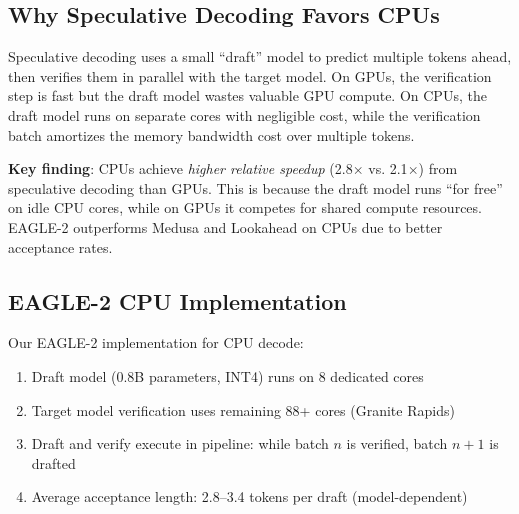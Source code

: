 \documentclass[conference,10pt]{IEEEtran}
\begin{document}
\subsection{Why Speculative Decoding Favors CPUs}

Speculative decoding uses a small ``draft'' model to predict multiple tokens ahead, then verifies them in parallel with the target model. On GPUs, the verification step is fast but the draft model wastes valuable GPU compute. On CPUs, the draft model runs on separate cores with negligible cost, while the verification batch amortizes the memory bandwidth cost over multiple tokens.

\begin{table}[!htbp]
\caption{Speculative Decoding Speedup by Platform}
\label{tab:spec}
\centering\scriptsize
{}
\end{table}

\textbf{Key finding}: CPUs achieve \emph{higher relative speedup} (2.8$\times$ vs. 2.1$\times$) from speculative decoding than GPUs. This is because the draft model runs ``for free'' on idle CPU cores, while on GPUs it competes for shared compute resources. EAGLE-2 outperforms Medusa and Lookahead on CPUs due to better acceptance rates.

\subsection{EAGLE-2 CPU Implementation}

Our EAGLE-2 implementation for CPU decode:

\begin{enumerate}
\item Draft model (0.8B parameters, INT4) runs on 8 dedicated cores
\item Target model verification uses remaining 88+ cores (Granite Rapids)
\item Draft and verify execute in pipeline: while batch $n$ is verified, batch $n+1$ is drafted
\item Average acceptance length: 2.8--3.4 tokens per draft (model-dependent)
\end{enumerate}
\end{document}

